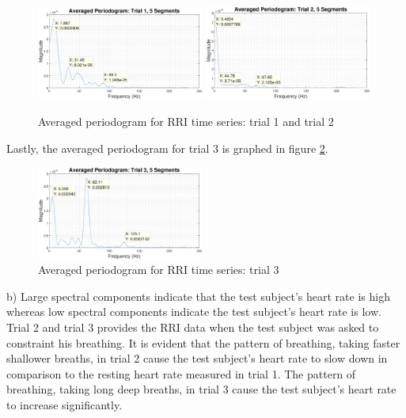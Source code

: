 \documentclass{article}
\begin{document}
\begin{figure}[H]
    \centering
    \includegraphics[width=0.49\textwidth]{avg_periodogram_rri_trial_1_5_segs}
    \includegraphics[width=0.49\textwidth]{avg_periodogram_rri_trial_2_5_segs}
    \caption{Averaged periodogram for RRI time series: trial 1 and trial 2}
    \label{fig:rri_psd_1_avg}
\end{figure}

Lastly, the averaged periodogram for trial 3 is graphed in figure \ref{fig:rri_psd_2_avg}.

\begin{figure}[H]
    \centering
    \includegraphics[width=0.49\textwidth]{avg_periodogram_rri_trial_3_5_segs}
    \caption{Averaged periodogram for RRI time series: trial 3}
    \label{fig:rri_psd_2_avg}
\end{figure}

b) Large spectral components indicate that the test subject's heart rate is high whereas low spectral components indicate the test subject's heart rate is low. Trial 2 and trial 3 provides the RRI data when the test subject was asked to constraint his breathing. It is evident that the pattern of breathing, taking faster shallower breaths, in trial 2 cause the test subject's heart rate to slow down in comparison to the resting heart rate measured in trial 1. The pattern of breathing, taking long deep breaths, in trial 3 cause the test subject's heart rate to increase significantly. 
\end{document}
